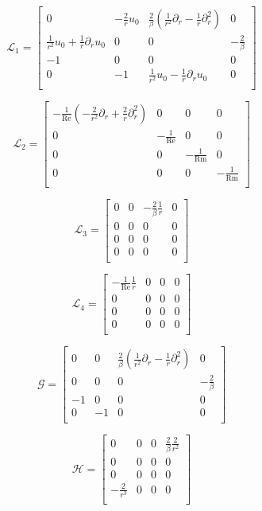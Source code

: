 \documentclass{emulateapj}
\newcommand{\beq}{\begin{equation}}
\newcommand{\eeq}{\end{equation}}
\newcommand\reye{\mathrm{Re}}
\newcommand\reym{\mathrm{Rm}}
\begin{document}
\beq
\mathcal{L}_1 = \left[\begin{matrix}
0 & -\frac{2}{r} u_0 & \frac{2}{\beta} (\frac{1}{r^2} \partial_r - \frac{1}{r}\partial_r^2) & 0 \\
\frac{1}{r^2} u_0 + \frac{1}{r}\partial_r u_0 & 0 & 0 & -\frac{2}{\beta} \\
-1 & 0 & 0 & 0 \\
0 & -1 & \frac{1}{r^2} u_0 - \frac{1}{r} \partial_r u_0 & 0 \\
\end{matrix}\right]
\eeq


\beq
\mathcal{L}_2 = \left[\begin{matrix}
-\frac{1}{\reye} (-\frac{2}{r^2}\partial_r + \frac{2}{r}\partial_r^2) & 0 & 0 & 0 \\
0 & -\frac{1}{\reye} & 0 & 0 \\
0 & 0 & -\frac{1}{\reym} & 0 \\
0 & 0 & 0 & -\frac{1}{\reym} \\
\end{matrix}\right]
\eeq

\beq
\mathcal{L}_3 = \left[\begin{matrix}
0 & 0 & -\frac{2}{\beta}\frac{1}{r} & 0 \\
0 & 0 & 0 & 0 \\
0 & 0 & 0 & 0 \\
0 & 0 & 0 & 0 \\
\end{matrix}\right]
\eeq

\beq
\mathcal{L}_4 = \left[\begin{matrix}
-\frac{1}{\reye}\frac{1}{r} & 0 & 0 & 0 \\
0 & 0 & 0 & 0 \\
0 & 0 & 0 & 0 \\
0 & 0 & 0 & 0 \\
\end{matrix}\right]
\eeq

\beq
\mathcal{G} = \left[\begin{matrix}
0 & 0 & \frac{2}{\beta}(\frac{1}{r^2}\partial_r - \frac{1}{r}\partial_r^2) & 0 \\
0 & 0 & 0 & -\frac{2}{\beta} \\
-1 & 0 & 0 & 0 \\
0 & -1 & 0 & 0 \\
\end{matrix}\right]
\eeq

\beq
\mathcal{H} = \left[\begin{matrix}
0 & 0 & 0 & \frac{2}{\beta} \frac{2}{r^2} \\
0 & 0 & 0 & 0 \\
0 & 0 & 0 & 0 \\
-\frac{2}{r^3} & 0 & 0 & 0 \\
\end{matrix}\right]
\eeq
\end{document}
